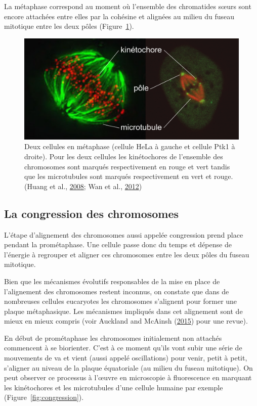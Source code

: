 \documentclass[12pt,a4paper,twoside,openright]{book}
\begin{document}
La métaphase correspond au moment où l'ensemble des chromatides sœurs
sont encore attachées entre elles par la cohésine et alignées au milieu
du fuseau mitotique entre les deux pôles
(Figure~\ref{fig:spindle_micro}).

\begin{figure}[htbp]
\centering
\includegraphics{figures/intro/spindle_micro.png}
\caption[Deux types de cellules différentes en métaphase]{\label{fig:spindle_micro}Deux
cellules en métaphase (cellule HeLa à gauche et cellule Ptk1 à droite).
Pour les deux cellules les kinétochores de l'ensemble des chromosomes
sont marqués respectivement en rouge et vert tandis que les microtubules
sont marqués respectivement en vert et rouge. (Huang et al.,
\protect\hyperlink{ref-Huang2008}{2008}; Wan et al.,
\protect\hyperlink{ref-Wan2012}{2012})}
\end{figure}

\subsection{La congression des
chromosomes}\label{la-congression-des-chromosomes}

L'étape d'alignement des chromosomes aussi appelée congression prend
place pendant la prométaphase. Une cellule passe donc du temps et
dépense de l'énergie à regrouper et aligner ces chromosomes entre les
deux pôles du fuseau mitotique.

Bien que les mécanismes évolutifs responsables de la mise en place de
l'alignement des chromosomes restent inconnus, on constate que dans de
nombreuses cellules eucaryotes les chromosomes s'alignent pour former
une plaque métaphasique. Les mécanismes impliqués dans cet alignement
sont de mieux en mieux compris (voir Auckland and McAinsh
(\protect\hyperlink{ref-Auckland2015a}{2015}) pour une revue).

En début de prométaphase les chromosomes initialement non attachés
commencent à se biorienter. C'est à ce moment qu'ils vont subir une
série de mouvements de va et vient (aussi appelé oscillations) pour
venir, petit à petit, s'aligner au niveau de la plaque équatoriale (au
milieu du fuseau mitotique). On peut observer ce processus à l'œuvre en
microscopie à fluorescence en marquant les kinétochores et les
microtubules d'une cellule humaine par exemple
(Figure~\ref{fig:congression}).
\end{document}
